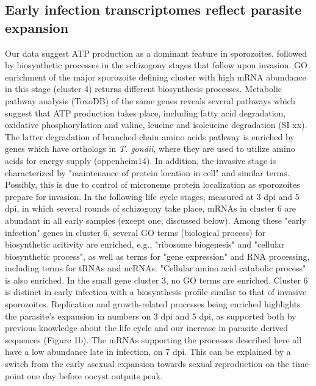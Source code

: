 \documentclass{bmcart}
\begin{document}
\subsection*{Early infection transcriptomes reflect parasite expansion}
Our data suggest ATP production as a dominant feature in sporozoites, followed by biosynthetic processes in the schizogony stages that follow upon invasion. GO enrichment of the major sporozoite defining cluster with high mRNA abundance in this stage (cluster 4) returns different biosynthesis processes. Metabolic pathway analysis (ToxoDB) of the same genes reveals several pathways which suggest that ATP production takes place, including fatty acid degradation, oxidative phosphorylation and  valine, leucine and isoleucine degradation (SI xx). The latter degradation of branched chain amino acids pathway is enriched by genes which have orthologs in \textit{T. gondii}, where they are used to utilize amino acids for energy supply (oppenheim14). In addition, the invasive stage is characterized by "maintenance of protein location in cell" and similar terms. Possibly, this is due to control of microneme protein localization as sporozoites prepare for invasion. In the following life cycle stages, measured at 3 dpi and 5 dpi, in which several rounds of schizogony take place, mRNAs in cluster 6 are abundant in all early samples (except one, discussed below). Among these "early infection" genes in cluster 6, several GO terms (biological process) for biosynthetic acitivity are enriched, e.g., "ribosome biogenesis" and "cellular biosynthetic process", as well as terms for "gene expression" and RNA processing, including terms for tRNAs and ncRNAs. "Cellular amino acid catabolic process" is also enriched. In the small gene cluster 3, no GO terms are enriched. Cluster 6 is distinct in early infection with a biosynthesis profile similar to that of invasive sporozoites. Replication and growth-related processes being enriched highlights the parasite's expansion in numbers on 3 dpi and 5 dpi, as supported both by previous knowledge about the life cycle and our increase in parasite derived sequences (Figure 1b). The mRNAs supporting the processes described here all have a low abundance late in infection, on 7 dpi. This can be explained by a switch from the early asexual expansion towards sexual reproduction on the time-point one day before oocyst outputs peak.
\end{document}
